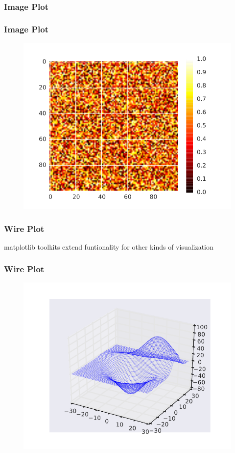 \begin{frame}
\frametitle{Image Plot}
\end{frame}

\begin{frame}
\frametitle{Image Plot}
\begin{figure}[h]
\centering
\includegraphics[width=.9\textwidth]{img/imageplot.pdf}
\end{figure}
\end{frame}


\begin{frame}
\frametitle{Wire Plot}
matplotlib toolkits extend funtionality for other kinds of visualization
\end{frame}

\begin{frame}
\frametitle{Wire Plot}
\begin{figure}[h]
\centering
\includegraphics[width=.9\textwidth]{img/wire.pdf}
\end{figure}
\end{frame}

